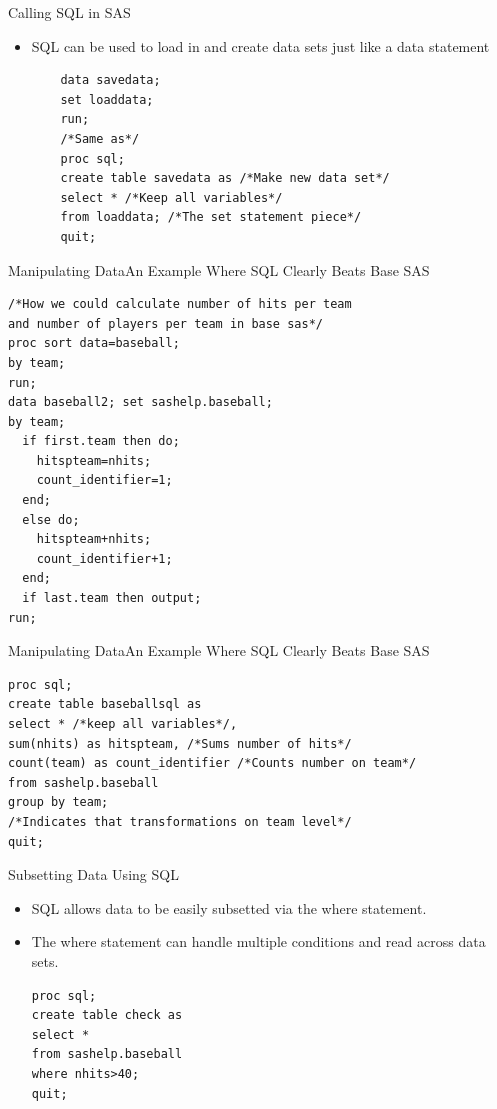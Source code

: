 \documentclass{beamer}
\begin{document}
\begin{frame}[fragile]{Calling SQL in SAS}
\begin{itemize}
    \item SQL can be used to load in and create data sets just like a data statement
    \begin{verbatim}
    data savedata;
    set loaddata;
    run;
    /*Same as*/
    proc sql;
    create table savedata as /*Make new data set*/
    select * /*Keep all variables*/
    from loaddata; /*The set statement piece*/
    quit;
    \end{verbatim}
\end{itemize}
\end{frame}
\begin{frame}[fragile]{Manipulating Data}{An Example Where SQL Clearly Beats Base SAS}
\begin{small}
\begin{verbatim}
/*How we could calculate number of hits per team 
and number of players per team in base sas*/
proc sort data=baseball;
by team;
run;
data baseball2; set sashelp.baseball;
by team;
  if first.team then do;
    hitspteam=nhits;
    count_identifier=1;
  end;
  else do;
    hitspteam+nhits;
    count_identifier+1;
  end;
  if last.team then output;
run;
\end{verbatim}
\end{small}
\end{frame}
\begin{frame}[fragile]{Manipulating Data}{An Example Where SQL Clearly Beats Base SAS}
\begin{verbatim}
proc sql;
create table baseballsql as 
select * /*keep all variables*/, 
sum(nhits) as hitspteam, /*Sums number of hits*/
count(team) as count_identifier /*Counts number on team*/
from sashelp.baseball 
group by team; 
/*Indicates that transformations on team level*/
quit;
\end{verbatim}
\end{frame}
\begin{frame}[fragile]{Subsetting Data Using SQL}
\begin{itemize}
    \item SQL allows data to be easily subsetted via the where statement.
\item The where statement can handle multiple conditions and read across data sets.
\begin{verbatim}
proc sql;
create table check as
select *
from sashelp.baseball
where nhits>40;
quit;
\end{verbatim}
\end{itemize}
\end{frame}
\end{document}
